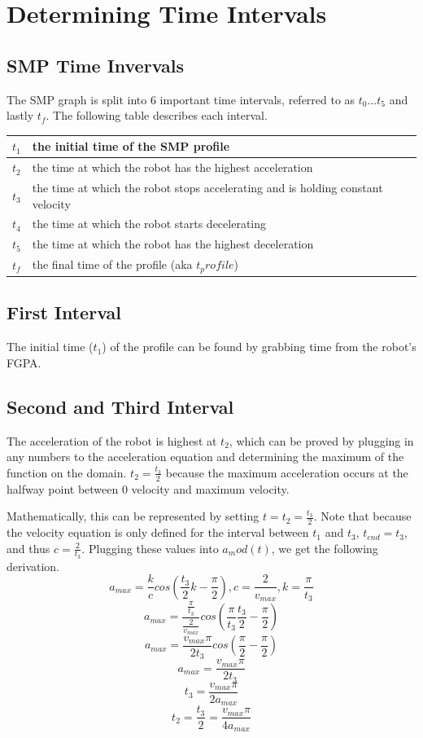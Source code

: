 \documentclass[a4paper,12pt]{report}
\newcommand{\tab}{\hspace{20pt}}
\begin{document}
	\chapter{Determining Time Intervals}
	\section{SMP Time Invervals}
	\tab The SMP graph is split into 6 important time intervals, referred to as $t_0...t_5$ and lastly $t_f$. The following table describes each interval.
	
	\begin{center}
		\begin{tabular}{| l | l |}
			\hline
			$t_1$ & the initial time of the SMP profile \\ \hline
			$t_2$ & the time at which the robot has the highest acceleration \\ \hline
			$t_3$ & the time at which the robot stops accelerating and is holding constant velocity \\ \hline
			$t_4$ & the time at which the robot starts decelerating \\ \hline
			$t_5$ & the time at which the robot has the highest deceleration \\ \hline
			$t_f$ & the final time of the profile (aka $t_profile$) \\ \hline
		\end{tabular}
	\end{center}
	
	\section{First Interval}
	\tab The initial time ($t_1$) of the profile can be found by grabbing time from the robot's FGPA.
	
	\section{Second and Third Interval}
	\tab The acceleration of the robot is highest at $t_2$, which can be proved by plugging in any numbers to the acceleration equation and determining the maximum of the function on the domain. $t_2 = \frac{t_3}{2}$ because the maximum acceleration occurs at the halfway point between 0 velocity and maximum velocity.
	
	\tab Mathematically, this can be represented by setting $t = t_2 = \frac{t_3}{2}$. Note that because the velocity equation is only defined for the interval between $t_1$ and $t_3$, $t_{end} = t_3$, and thus $c = \frac{2}{t_3}$. Plugging these values into $a_mod(t)$, we get the following derivation.
	\[a_{max} = \frac{k}{c} cos(\frac{t_3}{2} k - \frac{\pi}{2}), c = \frac{2}{v_{max}}, k = \frac{\pi}{t_{3}}\]
	\[a_{max} = \frac{\frac{\pi}{t_3}}{\frac{2}{v_{max}}} cos(\frac{\pi}{t_3} \frac{t_3}{2} - \frac{\pi}{2})\]
	\[a_{max} = \frac{v_{max}\pi}{2t_3} cos(\frac{\pi}{2} - \frac{\pi}{2})\]
	\[a_{max} = \frac{v_{max}\pi}{2t_3}\]
	\[t_3 = \frac{v_{max}\pi}{2a_{max}}\]
	\[t_2 = \frac{t_3}{2} = \frac{v_{max}\pi}{4a_{max}}\]
	
\end{document}
